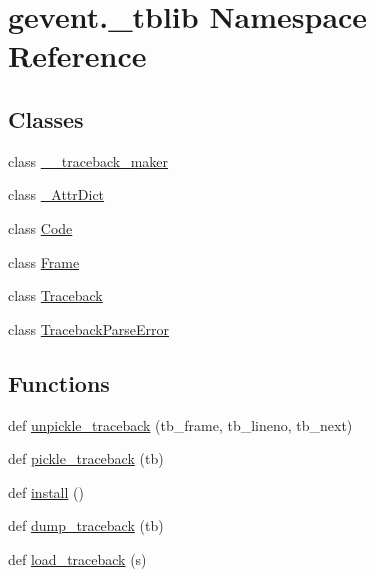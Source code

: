 \hypertarget{namespacegevent_1_1__tblib}{}\section{gevent.\+\_\+tblib Namespace Reference}
\label{namespacegevent_1_1__tblib}
\subsection*{Classes}
\begin{DoxyCompactItemize}
\item 
class \hyperlink{classgevent_1_1__tblib_1_1____traceback__maker}{\+\_\+\+\_\+traceback\+\_\+maker}
\item 
class \hyperlink{classgevent_1_1__tblib_1_1___attr_dict}{\+\_\+\+Attr\+Dict}
\item 
class \hyperlink{classgevent_1_1__tblib_1_1_code}{Code}
\item 
class \hyperlink{classgevent_1_1__tblib_1_1_frame}{Frame}
\item 
class \hyperlink{classgevent_1_1__tblib_1_1_traceback}{Traceback}
\item 
class \hyperlink{classgevent_1_1__tblib_1_1_traceback_parse_error}{Traceback\+Parse\+Error}
\end{DoxyCompactItemize}
\subsection*{Functions}
\begin{DoxyCompactItemize}
\item 
def \hyperlink{namespacegevent_1_1__tblib_aefab63abdb2aa60f7990a6b0d67cb0f9}{unpickle\+\_\+traceback} (tb\+\_\+frame, tb\+\_\+lineno, tb\+\_\+next)
\item 
def \hyperlink{namespacegevent_1_1__tblib_a55ea068cd001b419919dbae89775cae3}{pickle\+\_\+traceback} (tb)
\item 
def \hyperlink{namespacegevent_1_1__tblib_a10258bf4200e0c7dd0159d8f76628045}{install} ()
\item 
def \hyperlink{namespacegevent_1_1__tblib_af8b4fd4dac2bd31866c964fce7bb17f0}{dump\+\_\+traceback} (tb)
\item 
def \hyperlink{namespacegevent_1_1__tblib_a8f43f2f45dab455078c8e86841c749e1}{load\+\_\+traceback} (s)
\end{DoxyCompactItemize}
